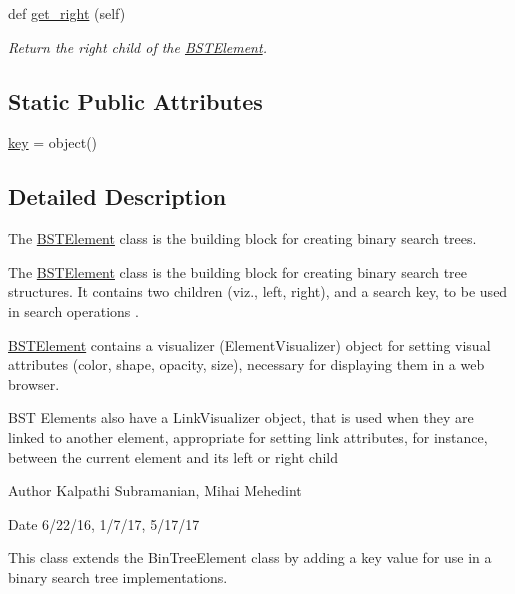 \begin{DoxyCompactItemize}
def \mbox{\hyperlink{class_bridges_1_1bst__element_1_1_b_s_t_element_a96c3a91946f244720054c2d480a05955}{get\+\_\+right}} (self)
\begin{DoxyCompactList}\small\item\em Return the right child of the \mbox{\hyperlink{class_bridges_1_1bst__element_1_1_b_s_t_element}{B\+S\+T\+Element}}. \end{DoxyCompactList}\end{DoxyCompactItemize}
\subsection*{Static Public Attributes}
\begin{DoxyCompactItemize}
\item 
\mbox{\hyperlink{class_bridges_1_1bst__element_1_1_b_s_t_element_a1b04a3676ac84d889491f8a496aedb91}{key}} = object()
\end{DoxyCompactItemize}


\subsection{Detailed Description}
The \mbox{\hyperlink{class_bridges_1_1bst__element_1_1_b_s_t_element}{B\+S\+T\+Element}} class is the building block for creating binary search trees. 

The \mbox{\hyperlink{class_bridges_1_1bst__element_1_1_b_s_t_element}{B\+S\+T\+Element}} class is the building block for creating binary search tree structures. It contains two children (viz., left, right), and a search key, to be used in search operations .

\mbox{\hyperlink{class_bridges_1_1bst__element_1_1_b_s_t_element}{B\+S\+T\+Element}} contains a visualizer (Element\+Visualizer) object for setting visual attributes (color, shape, opacity, size), necessary for displaying them in a web browser.

B\+ST Elements also have a Link\+Visualizer object, that is used when they are linked to another element, appropriate for setting link attributes, for instance, between the current element and its left or right child

\begin{DoxyAuthor}{Author}
Kalpathi Subramanian, Mihai Mehedint
\end{DoxyAuthor}
\begin{DoxyDate}{Date}
6/22/16, 1/7/17, 5/17/17
\end{DoxyDate}
This class extends the Bin\+Tree\+Element class by adding a \textquotesingle{}key\textquotesingle{} value for use in a binary search tree implementations. 

